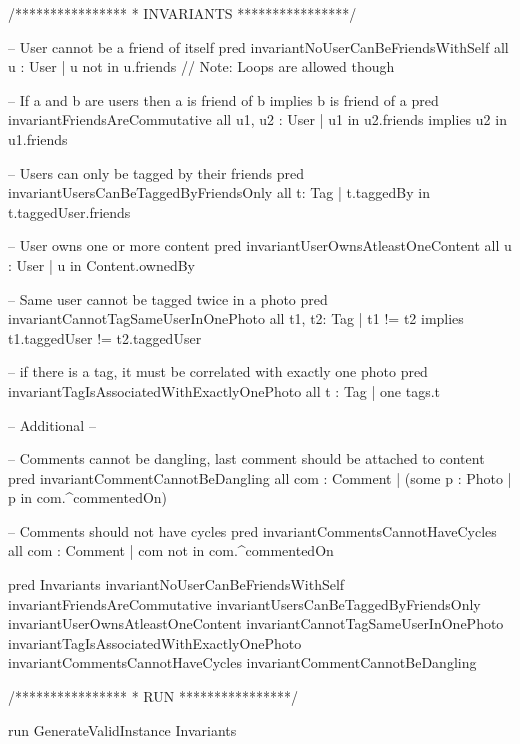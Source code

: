 \begin{enumerate}
\begin{alloy}
/****************
 * INVARIANTS 
 ****************/

-- User cannot be a friend of itself
pred invariantNoUserCanBeFriendsWithSelf {
	all u : User | u not in u.friends // Note: Loops are allowed though
}

-- If a and b are users then a is friend of b implies b is friend of a
pred invariantFriendsAreCommutative {
	all u1, u2 : User | u1 in u2.friends implies u2 in u1.friends
}

-- Users can only be tagged by their friends
pred invariantUsersCanBeTaggedByFriendsOnly {
	all  t: Tag | t.taggedBy in t.taggedUser.friends
}

-- User owns one or more content
pred invariantUserOwnsAtleastOneContent {
	all u : User | u in Content.ownedBy
}

-- Same user cannot be tagged twice in a photo
pred invariantCannotTagSameUserInOnePhoto {
	all t1, t2: Tag | t1 != t2 implies t1.taggedUser != t2.taggedUser 
}

-- if there is a tag, it must be correlated with exactly one photo
pred invariantTagIsAssociatedWithExactlyOnePhoto {
	all t : Tag | one tags.t
}

-- Additional --

-- Comments cannot be dangling, last comment should be attached to content
pred invariantCommentCannotBeDangling {
	all com : Comment | (some p : Photo | p in com.^commentedOn)
}

-- Comments should not have cycles
pred invariantCommentsCannotHaveCycles {
	all com : Comment | com not in com.^commentedOn
}

pred Invariants {
	invariantNoUserCanBeFriendsWithSelf
	invariantFriendsAreCommutative
	invariantUsersCanBeTaggedByFriendsOnly
	invariantUserOwnsAtleastOneContent
	invariantCannotTagSameUserInOnePhoto
	invariantTagIsAssociatedWithExactlyOnePhoto
	invariantCommentsCannotHaveCycles
	invariantCommentCannotBeDangling
}

/****************
 * RUN 
 ****************/

run GenerateValidInstance {
	Invariants
}
          \end{alloy}
\end{enumerate}
